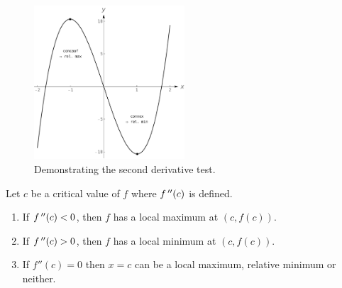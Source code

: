\begin{figure}[h]
	\begin{center}
			\includegraphics[width=0.5\textwidth]{fig_behaviour_22}
	\caption{Demonstrating the second derivative test.}
	\label{fig_behaviour_22}
	\end{center}
\end{figure}

\begin{theorem}\label{thm:second_der}%
 Let $c$ be a critical value of $f$ where  $f\,''(c)$ is defined. 
\begin{enumerate}
\item If $f\,''(c)<0$, then $f$ has a local maximum at $(c,f(c))$.
\item If $f\,''(c)>0$, then $f$ has a local minimum at $(c,f(c))$.
\item If $f''(c)=0$ then $x=c$ can be a local maximum, relative minimum or neither.
\end{enumerate}
\end{theorem}

\ifanalysis

